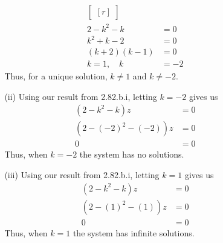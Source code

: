 \documentclass[12pt]{article}
\begin{document}
\begin{enumerate}
\begin{enumerate}
\begin{enumerate}
\begin{align*}
\begin{bmatrix}[r]
		\end{bmatrix}\\
		2-k^2-k &=0\\
		k^2+k-2 &= 0\\
		(k+2)(k-1) &=0\\
		k=1, \quad k&=-2
		\end{align*}	
		Thus, for a unique solution, $k \neq 1$ and $k \neq -2$.\\
		\item [(ii)]
		Using our result from 2.82.b.i, letting $k=-2$ gives us
		\begin{align*}
		(2-k^2-k)z &= 0\\
		(2-(-2)^2-(-2))z &= 0\\
		0 &= 0
		\end{align*}
		Thus, when $k=-2$ the system has no solutions.\\

		\item [(iii)]
		Using our result from 2.82.b.i, letting $k = 1$ gives us
		\begin{align*}
		(2-k^2-k)z &= 0\\
		(2-(1)^2-(1))z &= 0\\
		0 &= 0
		\end{align*}
		Thus, when $k=1$ the system has infinite solutions.\\
		

\end{enumerate}
\end{enumerate}
\end{enumerate}
\end{document}
